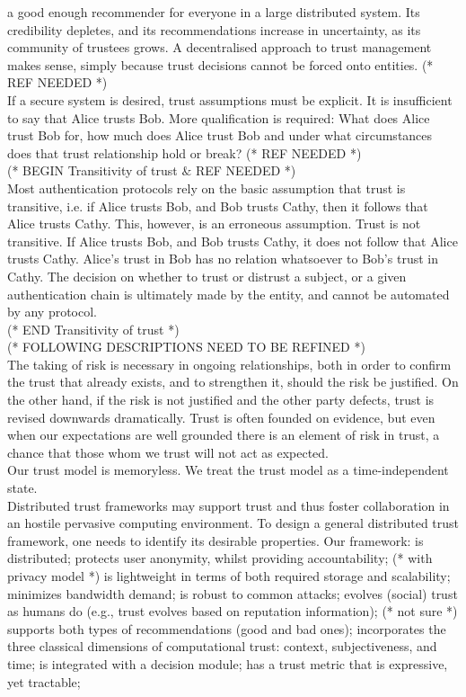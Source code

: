 \documentclass{article}
\begin{document}
a good enough recommender for everyone in a large distributed system. Its credibility depletes, and its recommendations increase in uncertainty,
as its community of trustees grows. A decentralised approach to trust management makes sense, simply because trust decisions cannot be forced onto
entities. (* REF NEEDED *)\\
If a secure system is desired, trust assumptions must be explicit. It is insufficient to say that Alice trusts Bob. More qualification is required:
What does Alice trust Bob for, how much does Alice trust Bob and under what circumstances does that trust relationship hold or break? (* REF NEEDED
*)\\
(* BEGIN Transitivity of trust $\&$ REF NEEDED *)\\
Most authentication protocols rely on the basic assumption that trust is transitive, i.e. if Alice trusts Bob, and Bob trusts Cathy, then it follows
that Alice trusts Cathy. This, however, is an erroneous assumption. Trust is not transitive. If Alice trusts Bob, and Bob trusts Cathy, it does not
follow that Alice trusts Cathy. Alice{'}s trust in Bob has no relation whatsoever to Bob{'}s trust in Cathy. The decision on whether to trust or
distrust a subject, or a given authentication chain is ultimately made by the entity, and cannot be automated by any protocol.\\
(* END Transitivity of trust *)\\
(* FOLLOWING DESCRIPTIONS NEED TO BE REFINED *)\\
The taking of risk is necessary in ongoing relationships, both in order to confirm the trust that already exists, and to strengthen it, should the
risk be justified. On the other hand, if the risk is not justified and the other party defects, trust is revised downwards dramatically. Trust is
often founded on evidence, but even when our expectations are well grounded there is an element of risk in trust, a chance that those whom we trust
will not act as expected.\\
Our trust model is memoryless. We treat the trust model as a time-independent state.\\
Distributed trust frameworks may support trust and thus foster collaboration in an hostile pervasive computing environment. To design a general distributed
trust framework, one needs to identify its desirable properties. Our framework: is distributed; protects user anonymity, whilst providing accountability;
(* with privacy model *) is lightweight in terms of both required storage and scalability; minimizes bandwidth demand; is robust to common attacks;
evolves (social) trust as humans do (e.g., trust evolves based on reputation information); (* not sure *) supports both types of recommendations
(good and bad ones); incorporates the three classical dimensions of computational trust: context, subjectiveness, and time; is integrated with a
decision module; has a trust metric that is expressive, yet tractable;
\end{document}
